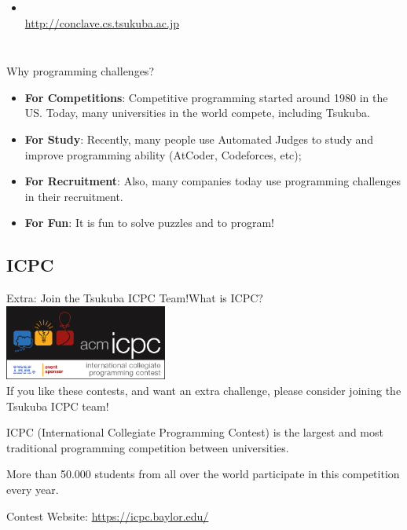\begin{frame}
\begin{columns}
{\begin{itemize}
      \item {}\\ {\smaller \url{http://conclave.cs.tsukuba.ac.jp}}
    \end{itemize}
    }
  \end{columns}
\end{frame}

\begin{frame}{Why programming challenges?}
  \begin{itemize}
  \item {\bf For Competitions}: Competitive programming started around
    1980 in the US. Today, many universities in the world compete,
    including Tsukuba.
    \bigskip

  \item {\bf For Study}: Recently, many people use Automated Judges to
    study and improve programming ability (AtCoder, Codeforces, etc);
    \bigskip

  \item {\bf For Recruitment}: Also, many companies today use
    programming challenges in their recruitment.\bigskip

  \item {\bf For Fun}: It is fun to solve puzzles and to program!
  \end{itemize}
\end{frame}


\subsection{ICPC}
\begin{frame}{Extra: Join the Tsukuba ICPC Team!}{What is ICPC?}
  \hfill \includegraphics[width=0.4\textwidth]{img/icpclogo}\\
  If you like these contests, and want an extra challenge, please consider
  joining the Tsukuba ICPC team!
  \bigskip

  ICPC (International Collegiate Programming Contest) is the largest and
  most traditional programming competition between universities.
  \bigskip

  More than 50.000 students from all over the world participate in this
  competition every year.
  \bigskip

  Contest Website: \url{https://icpc.baylor.edu/}
\end{frame}

